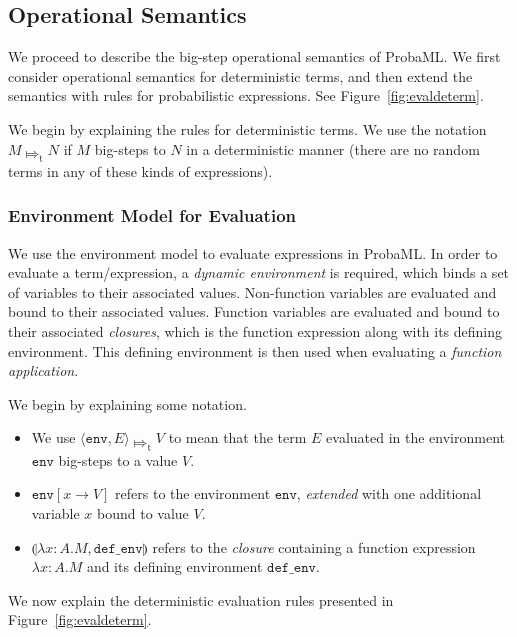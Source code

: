 \documentclass[pageno]{jpaper}
\newcommand{\tsteps}{\Mapsto_{\textrm{t}}}
\newcommand{\env}{\mathtt{env}}
\newcommand{\parens}[1]{\llparenthesis #1 \rrparenthesis}
\newcommand{\evalenv}[1]{\langle \env, #1 \rangle}
\newcommand{\mt}[1]{\mathtt{#1}}
\begin{document}
\subsection{Operational Semantics}
We proceed to describe the big-step operational semantics of ProbaML. We first consider operational semantics for deterministic terms, and then extend the semantics with rules for probabilistic expressions. See Figure~\ref{fig:evaldeterm}.

We begin by explaining the rules for deterministic terms. We use the notation $M \tsteps N$ if $M$ big-steps to $N$ in a deterministic manner (there are no random terms in any of these kinds of expressions).
\subsubsection{Environment Model for Evaluation}
We use the environment model to evaluate expressions in ProbaML. In order to evaluate a term/expression, a \emph{dynamic environment} is required, which binds a set of variables to their associated values. Non-function variables are evaluated and bound to their associated values. Function variables are evaluated and bound to their associated \emph{closures}, which is the function expression along with its defining environment. This defining environment is then used when evaluating a \emph{function application}.

We begin by explaining some notation.
\begin{itemize}
  \item We use $\evalenv{E} \tsteps V$ to mean that the term $E$ evaluated in the environment $\mt{env}$ big-steps to a value $V$.
  \item $\env[x \rightarrow V]$ refers to the environment $\env$, \emph{extended} with one additional variable $x$ bound to value $V$.
  \item $\parens{\lambda x:A.M, \mt{def\_env}}$ refers to the \emph{closure} containing a function expression $\lambda x:A.M$ and its defining environment $\mt{def\_env}$.
\end{itemize}

We now explain the deterministic evaluation rules presented in Figure~\ref{fig:evaldeterm}.
\end{document}
